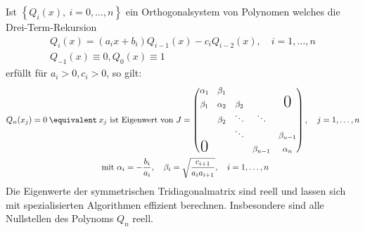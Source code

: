 \begin{maththeorem}
\label{golubwelschalg}
Ist $\left\lbrace Q_i(x),\: i=0,\dots,n\right\rbrace$ ein Orthogonalsystem von Polynomen welches die Drei-Term-Rekursion
\begin{eqnarray}
\label{threetermgolub}
Q_i(x)=(a_ix+b_i)Q_{i-1}(x)-c_iQ_{i-2}(x),\quad i=1,\dots , n\\
Q_{-1}(x)\equiv 0, Q_0(x)\equiv 1\nonumber
\end{eqnarray}
erfüllt für $a_i>0,c_i>0$, so gilt:
\begin{align*}
Q_n(x_j)=0\: \equivalent \: &x_j\text{ ist Eigenwert von }J=\begin{pmatrix}
\alpha_1 & \beta_1 &  &  &  \\ 
\beta_1 & \alpha_2 & \beta_2 & & \text{\huge0} \\ 
 & \beta_2 & \ddots & \ddots &  \\ 
 &  & \ddots & & \beta_{n-1} \\
\text{\huge0} &  &  & \beta_{n-1} & \alpha_n
\end{pmatrix},\quad j=1,\dots,n\\
&\text{ mit } \alpha_i=-\frac{b_i}{a_i},\quad \beta_i=\sqrt{\frac{c_{i+1}}{a_ia_{i+1}}},\quad i=1,\dots,n
\end{align*}
Die Eigenwerte der symmetrischen Tridiagonalmatrix sind reell und lassen sich mit spezialisierten Algorithmen effizient berechnen. Insbesondere sind alle Nullstellen des Polynoms $Q_n$ reell.
\end{maththeorem}
